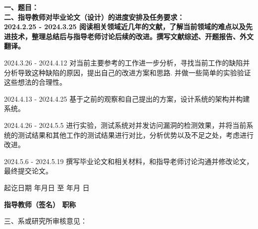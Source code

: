 \cleardoublepage{}

{
    \bfseries
    \noindent 一、题目：\\
    \noindent 二、指导教师对毕业论文（设计）的进度安排及任务要求：\\

    2024.2.25 - 2024.3.25 阅读相关领域近几年的文献，了解当前领域的难点以及先进技术，整理总结后与指导老师讨论后续的改进。撰写文献综述、开题报告、外文翻译。

    2024.3.26 - 2024.4.12 对当前主要参考的工作进一步分析，寻找当前工作的缺陷并分析导致这种缺陷的原因，提出自己的改进方案和思路. 并做一些简单的实验验证这些想法的合理性。

    2024.4.13 - 2024.4.25 基于之前的观察和自己提出的方案，设计系统的架构并构建系统。

    2024.4.26 - 2024.5.5 进行实验，测试系统对并发访问漏洞的检测效果，并将当前系统的测试结果和其他工作的测试结果进行对比，分析优势以及不足之处，考虑进行改进。

    2024.5.6 - 2024.5.19 撰写毕业论文和相关材料，和指导老师讨论沟通并修改论文，最终提交论文。

    \vskip 10mm

    \noindent 起讫日期  \quad 年\quad  月\quad  日 \quad 至  \quad 年\quad  月 \quad 日
    \begin{flushright}
        \bfseries {}
            指导教师（签名） \underline{} 职称 \underline{}
    \end{flushright}

    \noindent 三、系或研究所审核意见：\\

    \mbox{} \vfill
    \signature{负责人（签名）}
}
